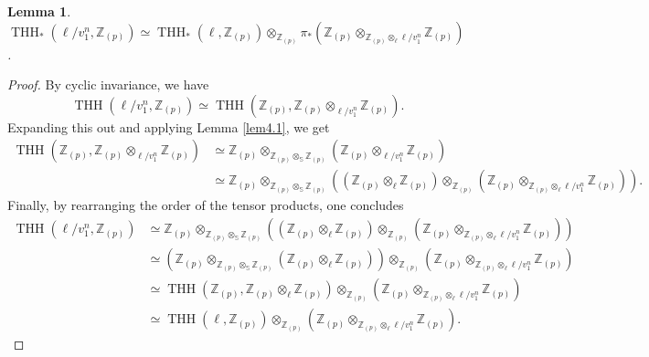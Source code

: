 \documentclass[10pt,a4paper]{amsart}
\newtheorem{lemma}{Lemma}
\DeclareMathOperator{\THH}{THH}
\newcommand{\sss}{\mathbb{S}}
\newcommand{\zz}{\mathbb{Z}}
\begin{document}
\begin{lemma}\label{lem4.2}
	$\THH_*(\ell/v_1^n,\zz_{(p)})\simeq \THH_*(\ell,\zz_{(p)})\otimes_{\zz_{(p)}}\pi_*(\zz_{(p)}\otimes_{\zz_{(p)}\otimes_{\ell}\ell/v_1^n}\zz_{(p)})$.
\end{lemma}

\begin{proof}
By cyclic invariance, we have
$$\THH(\ell/v_1^n,\zz_{(p)})\simeq \THH(\zz_{(p)},\zz_{(p)}\otimes_{\ell/v_1^n}\zz_{(p)}).$$
Expanding this out and applying Lemma \ref{lem4.1}, we get
\begin{align*}
\THH(\zz_{(p)},\zz_{(p)}\otimes_{\ell/v_1^n}\zz_{(p)})&\simeq \zz_{(p)}\otimes_{\zz_{(p)}\otimes_{\sss}\zz_{(p)}}(\zz_{(p)}\otimes_{\ell/v_1^n}\zz_{(p)})\\
&\simeq \zz_{(p)}\otimes_{\zz_{(p)}\otimes_{\sss}\zz_{(p)}}((\zz_{(p)}\otimes_{\ell}\zz_{(p)})\otimes_{\zz_{(p)}}(\zz_{(p)}\otimes_{\zz_{(p)}\otimes_{\ell}\ell/v_1^n}\zz_{(p)})).
\end{align*}
Finally, by rearranging the order of the tensor products, one concludes
\begin{align*}
\THH(\ell/v_1^n,\zz_{(p)})&\simeq \zz_{(p)}\otimes_{\zz_{(p)}\otimes_{\sss}\zz_{(p)}}((\zz_{(p)}\otimes_{\ell}\zz_{(p)})\otimes_{\zz_{(p)}}(\zz_{(p)}\otimes_{\zz_{(p)}\otimes_{\ell}\ell/v_1^n}\zz_{(p)}))\\
&\simeq (\zz_{(p)}\otimes_{\zz_{(p)}\otimes_{\sss}\zz_{(p)}}(\zz_{(p)}\otimes_{\ell}\zz_{(p)}))\otimes_{\zz_{(p)}}(\zz_{(p)}\otimes_{\zz_{(p)}\otimes_{\ell}\ell/v_1^n}\zz_{(p)})\\
&\simeq \THH(\zz_{(p)},\zz_{(p)}\otimes_{\ell}\zz_{(p)})\otimes_{\zz_{(p)}}(\zz_{(p)}\otimes_{\zz_{(p)}\otimes_{\ell}\ell/v_1^n}\zz_{(p)})\\
&\simeq \THH(\ell,\zz_{(p)})\otimes_{\zz_{(p)}}(\zz_{(p)}\otimes_{\zz_{(p)}\otimes_{\ell}\ell/v_1^n}\zz_{(p)}).
\end{align*} 
\end{proof}
\end{document}

